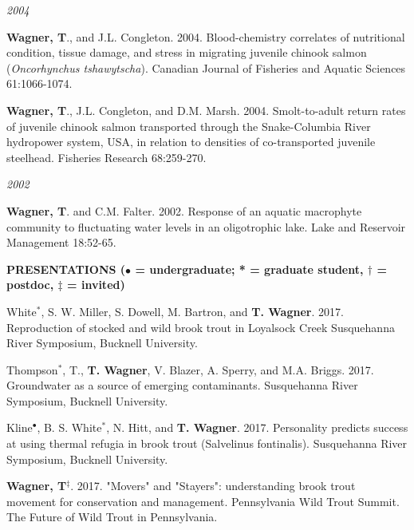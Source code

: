 \documentclass[10pt]{article}
\begin{document}
\begin{flushleft}
\begin{etaremune}[start=4]
\end{etaremune}
\emph{2004}
\begin{etaremune}[start=3]
\item {\bf Wagner, T}., and J.L. Congleton. 2004. Blood-chemistry correlates of nutritional condition, tissue damage, and stress in migrating juvenile chinook salmon (\emph{Oncorhynchus tshawytscha}). Canadian Journal of Fisheries and Aquatic Sciences 61:1066-1074.

\item {\bf Wagner, T}., J.L. Congleton, and D.M. Marsh. 2004. Smolt-to-adult return rates of juvenile chinook salmon transported through the Snake-Columbia River hydropower system, USA, in relation to densities of co-transported juvenile steelhead. Fisheries Research 68:259-270.

\end{etaremune}
\emph{2002}
\begin{etaremune}[start=1]
\item {\bf Wagner, T}. and C.M. Falter. 2002. Response of an aquatic macrophyte community to fluctuating water levels in an oligotrophic lake. Lake and Reservoir Management 18:52-65.
\end{etaremune}

\vspace{8pt}
\centerline {\bf{PRESENTATIONS ({\small $\bullet$ = undergraduate; * = graduate student, $\dagger$ = postdoc, $\ddagger$ = invited})}}
\vspace{5pt}
\begin{etaremune}
\item White$^*$, S. W. Miller, S. Dowell, M. Bartron, and {\bf T. Wagner}. 2017. Reproduction of stocked and wild brook trout in Loyalsock Creek  Susquehanna River Symposium, Bucknell University.

\item Thompson$^*$, T., {\bf T. Wagner}, V. Blazer, A. Sperry, and M.A. Briggs. 2017. Groundwater as a source of emerging contaminants. Susquehanna River Symposium, Bucknell University.

\item Kline$^\bullet$, B. S. White$^*$, N. Hitt, and {\bf T. Wagner}. 2017. Personality predicts success at using thermal refugia in brook trout (Salvelinus fontinalis). Susquehanna River Symposium, Bucknell University.

\item {\bf Wagner, T}$^\ddagger$. 2017. "Movers" and "Stayers": understanding brook trout movement for conservation and management. Pennsylvania Wild Trout Summit. The Future of Wild Trout in Pennsylvania.


\end{etaremune}
\end{flushleft}
\end{document}
